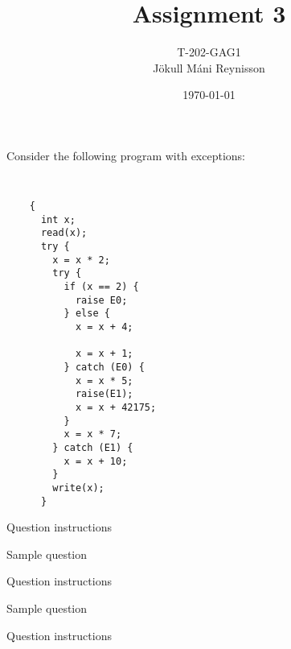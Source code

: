 \documentclass[11pt]{exam}
\begin{document}
\title{Assignment 3}
\author{{\small T-202-GAG1} \\ Jökull Máni Reynisson}
\date{\today}
\maketitle



\begin{questions}


\question Consider the following program with exceptions:
{\tt
  \begin{lstlisting}
    {
      int x;
      read(x);
      try {
        x = x * 2;
        try {
          if (x == 2) {
            raise E0;
          } else {
            x = x + 4;

            x = x + 1;
          } catch (E0) {
            x = x * 5;
            raise(E1);
            x = x + 42175;
          }
          x = x * 7;
        } catch (E1) {
          x = x + 10;
        }
        write(x);
      }
  \end{lstlisting}
}	\quad

	Question instructions

	\begin{framed}


	\end{framed}



	\question Sample question


	\quad

	Question instructions

	\begin{framed}


	\end{framed}



	\question Sample question


	\quad

	Question instructions

	\begin{framed}


	\end{framed}



\end{questions}
\end{document}
